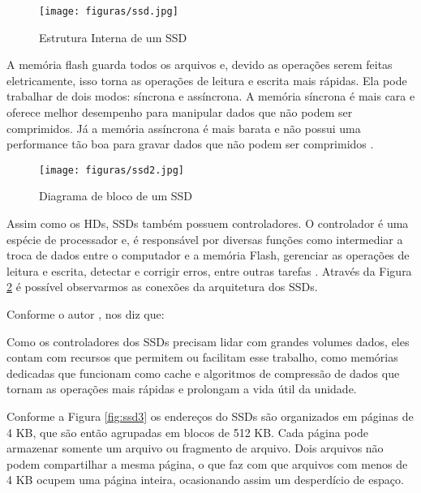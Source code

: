 \begin{figure}[htb]
	\caption{\label{fig:ssd2}Estrutura Interna de um SSD}
	\begin{center}
	    \texttt{[image: figuras/ssd.jpg]}
	\end{center}
\end{figure}


A memória flash guarda todos os arquivos e, devido as operações serem feitas eletricamente, isso torna as operações de leitura e escrita mais rápidas. Ela pode trabalhar de dois modos: síncrona e assíncrona. A memória síncrona é mais cara e oferece melhor desempenho para manipular dados que não podem ser comprimidos. Já a memória assíncrona é mais barata e não possui uma performance tão boa para gravar dados que não podem ser comprimidos \cite{ssd2}.

\begin{figure}[htb]
	\caption{\label{fig:micheloni2012inside}Diagrama de bloco de um SSD}
	\begin{center}
	    \texttt{[image: figuras/ssd2.jpg]}
	\end{center}
\end{figure}


Assim como os HDs, SSDs também possuem controladores. O controlador é uma espécie de processador e, é responsável por diversas funções como intermediar a troca de dados entre o computador e a memória Flash, gerenciar as operações de leitura e escrita, detectar e corrigir erros, entre outras tarefas \cite{ssd}. Através da Figura \ref{fig:micheloni2012inside} é possível observarmos as conexões da arquitetura dos SSDs. 

Conforme o autor \cite{ssd}, nos diz que:

\begin{citacao}
Como os controladores dos SSDs precisam lidar com grandes volumes dados, eles contam com recursos que permitem ou facilitam esse trabalho, como memórias dedicadas que funcionam como cache e algoritmos de compressão de dados que tornam as operações mais rápidas e prolongam a vida útil da unidade.
\end{citacao}

Conforme a Figura \ref{fig:ssd3} os endereços do SSDs são organizados em páginas de 4 KB, que são então agrupadas em blocos de 512 KB. Cada página pode armazenar somente um arquivo ou fragmento de arquivo. Dois arquivos não podem compartilhar a mesma página, o que faz com que arquivos com menos de 4 KB ocupem uma página inteira, ocasionando assim um desperdício de espaço. 

